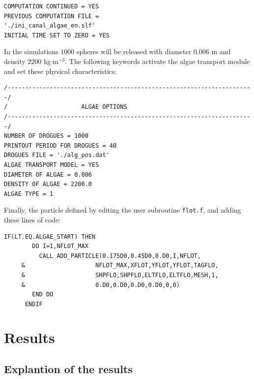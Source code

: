 \lstset{language=TelemacCas,
        basicstyle=\scriptsize\ttfamily}

\begin{lstlisting}[frame=trBL]
COMPUTATION CONTINUED = YES
PREVIOUS COMPUTATION FILE =
'./ini_canal_algae_en.slf'
INITIAL TIME SET TO ZERO = YES
\end{lstlisting}

In the simulations $1000$ spheres will be released with diameter $0.006$ m and density $2200$ kg$\cdot$m$^{-3}$.
The following keywords activate the algae transport module and set these physical characteristics:

\lstset{language=TelemacCas,
        basicstyle=\scriptsize\ttfamily}

\begin{lstlisting}[frame=trBL]
/----------------------------------------------------------------------/
/                     ALGAE OPTIONS
/----------------------------------------------------------------------/
NUMBER OF DROGUES = 1000
PRINTOUT PERIOD FOR DROGUES = 40
DROGUES FILE = './alg_pos.dat'
ALGAE TRANSPORT MODEL = YES
DIAMETER OF ALGAE = 0.006
DENSITY OF ALGAE = 2200.0
ALGAE TYPE = 1
\end{lstlisting}


Finally, the particle defined by editing the user subroutine \texttt{flot.f}, and adding these lines of code:

\lstset{language=Fortran,
        basicstyle=\scriptsize\ttfamily}

\begin{lstlisting}[frame=trBL]
      IF(LT.EQ.ALGAE_START) THEN
        DO I=1,NFLOT_MAX
          CALL ADD_PARTICLE(0.175D0,0.45D0,0.D0,I,NFLOT,
     &                    NFLOT_MAX,XFLOT,YFLOT,YFLOT,TAGFLO,
     &                    SHPFLO,SHPFLO,ELTFLO,ELTFLO,MESH,1,
     &                    0.D0,0.D0,0.D0,0.D0,0,0)
        END DO
      ENDIF
\end{lstlisting}

%
%
%
\section{Results}

\subsection{Explantion of the results}

